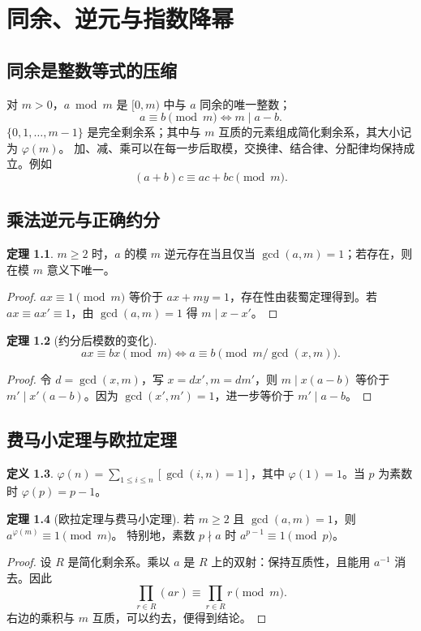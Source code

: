 \documentclass[UTF8,a4paper,11pt,oneside,openany,fontset=fandol]{ctexbook}
\theoremstyle{definition}
\newtheorem{definition}{定义}[chapter]
\newtheorem{theorem}[definition]{定理}
\newcommand{\iva}[1]{\left[#1\right]}
\begin{document}
\chapter{同余、逆元与指数降幂}
\section{同余是整数等式的压缩}
对 $m>0$，$a\bmod m$ 是 $[0,m)$ 中与 $a$ 同余的唯一整数；
\[
 a\equiv b\pmod m\iff m\mid a-b.
\]
$\{0,1,\ldots,m-1\}$ 是完全剩余系；其中与 $m$ 互质的元素组成简化剩余系，其大小记为 $\varphi(m)$。
加、减、乘可以在每一步后取模，交换律、结合律、分配律均保持成立。例如
\[
 (a+b)c\equiv ac+bc\pmod m.
\]

\section{乘法逆元与正确约分}
\begin{theorem}
$m\ge2$ 时，$a$ 的模 $m$ 逆元存在当且仅当 $\gcd(a,m)=1$；若存在，则在模 $m$ 意义下唯一。
\end{theorem}
\begin{proof}
$ax\equiv1\pmod m$ 等价于 $ax+my=1$，存在性由裴蜀定理得到。若 $ax\equiv ax'\equiv1$，由 $\gcd(a,m)=1$ 得 $m\mid x-x'$。
\end{proof}
\begin{theorem}[约分后模数的变化]
\[
 ax\equiv bx\pmod m
 \iff a\equiv b\pmod{m/\gcd(x,m)}.
\]
\end{theorem}
\begin{proof}
令 $d=\gcd(x,m)$，写 $x=dx',m=dm'$，则 $m\mid x(a-b)$ 等价于 $m'\mid x'(a-b)$。因为 $\gcd(x',m')=1$，进一步等价于 $m'\mid a-b$。
\end{proof}


\section{费马小定理与欧拉定理}
\begin{definition}
$\varphi(n)=\sum_{1\le i\le n}\iva{\gcd(i,n)=1}$，其中 $\varphi(1)=1$。当 $p$ 为素数时 $\varphi(p)=p-1$。
\end{definition}
\begin{theorem}[欧拉定理与费马小定理]
若 $m\ge2$ 且 $\gcd(a,m)=1$，则 $a^{\varphi(m)}\equiv1\pmod m$。
特别地，素数 $p\nmid a$ 时 $a^{p-1}\equiv1\pmod p$。
\end{theorem}
\begin{proof}
设 $R$ 是简化剩余系。乘以 $a$ 是 $R$ 上的双射：保持互质性，且能用 $a^{-1}$ 消去。因此
\[
 \prod_{r\in R}(ar)\equiv\prod_{r\in R}r\pmod m.
\]
右边的乘积与 $m$ 互质，可以约去，便得到结论。
\end{proof}
\end{document}

